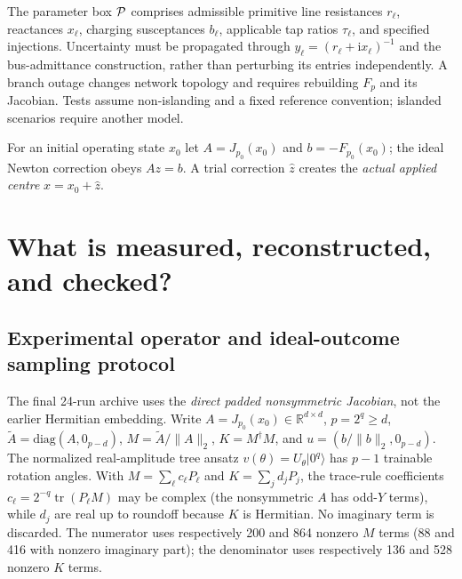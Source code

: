 \documentclass[11pt,a4paper]{article}
\theoremstyle{remark}\newtheorem{remark}[theorem]{Remark}
\begin{document}
The parameter box $\mathcal P$ comprises admissible primitive line resistances $r_\ell$, reactances $x_\ell$, charging susceptances $b_\ell$, applicable tap ratios $\tau_\ell$, and specified injections. Uncertainty must be propagated through $y_\ell=(r_\ell+\mathrm i x_\ell)^{-1}$ and the bus-admittance construction, rather than perturbing its entries independently. A branch outage changes network topology and requires rebuilding $F_p$ and its Jacobian. Tests assume non-islanding and a fixed reference convention; islanded scenarios require another model.

For an initial operating state $x_0$ let $A=J_{p_0}(x_0)$ and $b=-F_{p_0}(x_0)$; the ideal Newton correction obeys $Az=b$. A trial correction $\widehat z$ creates the \emph{actual applied centre} $\widehat x=x_0+\widehat z$.

\section{What is measured, reconstructed, and checked?}\label{sec:readout}
\subsection{Experimental operator and ideal-outcome sampling protocol}
The final 24-run archive uses the \emph{direct padded nonsymmetric Jacobian}, not the earlier Hermitian embedding. Write $A=J_{p_0}(x_0)\in\mathbb R^{d\times d}$, $p=2^q\ge d$, $\widetilde A=\mathrm{diag}(A,0_{p-d})$, $M=\widetilde A/\|A\|_2$, $K=M^\dagger M$, and $u=(b/\|b\|_2,0_{p-d})$. The normalized real-amplitude tree ansatz $v(\theta)=U_\theta|0^q\rangle$ has $p-1$ trainable rotation angles. With $M=\sum_{\ell}c_\ell P_\ell$ and $K=\sum_j d_jP_j$, the trace-rule coefficients $c_\ell=2^{-q}\operatorname{tr}(P_\ell M)$ may be complex (the nonsymmetric $A$ has odd-$Y$ terms), while $d_j$ are real up to roundoff because $K$ is Hermitian. No imaginary term is discarded. The numerator uses respectively 200 and 864 nonzero $M$ terms (88 and 416 with nonzero imaginary part); the denominator uses respectively 136 and 528 nonzero $K$ terms.
\end{document}
